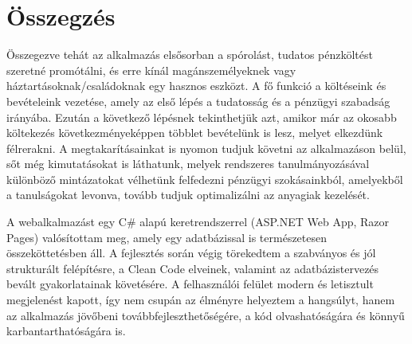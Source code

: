 \chapter{Összegzés}
\label{ch:sum}

Összegezve tehát az alkalmazás elsősorban a spórolást, tudatos pénzköltést szeretné promótálni, és erre kínál magánszemélyeknek vagy háztartásoknak/családoknak egy hasznos eszközt. A fő funkció a költéseink és bevételeink vezetése, amely az első lépés a tudatosság és a pénzügyi szabadság irányába. Ezután a következő lépésnek tekinthetjük azt, amikor már az okosabb költekezés következményeképpen többlet bevételünk is lesz, melyet elkezdünk félrerakni. A megtakarításainkat is nyomon tudjuk követni az alkalmazáson belül, sőt még kimutatásokat is láthatunk, melyek rendszeres tanulmányozásával különböző mintázatokat vélhetünk felfedezni pénzügyi szokásainkból, amelyekből a tanulságokat levonva, tovább tudjuk optimalizálni az anyagiak kezelését.

A webalkalmazást egy C\# alapú keretrendszerrel (ASP.NET Web App, Razor Pages) valósítottam meg, amely egy adatbázissal is természetesen összeköttetésben áll. A fejlesztés során végig törekedtem a szabványos és jól strukturált felépítésre, a Clean Code elveinek, valamint az adatbázistervezés bevált gyakorlatainak követésére. A felhasználói felület modern és letisztult megjelenést kapott, így nem csupán az élményre helyeztem a hangsúlyt, hanem az alkalmazás jövőbeni továbbfejleszthetőségére, a kód olvashatóságára és könnyű karbantarthatóságára is.
